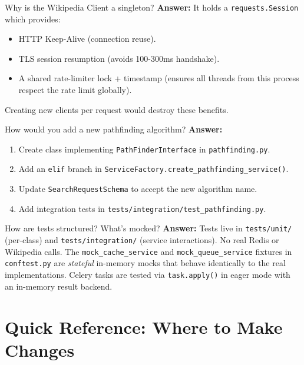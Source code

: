 \documentclass[11pt,a4paper]{article}
\begin{document}
\begin{qabox}{Why is the Wikipedia Client a singleton?}
\textbf{Answer:} It holds a \texttt{requests.Session} which provides:
\begin{itemize}[leftmargin=*, nosep]
    \item HTTP Keep-Alive (connection reuse).
    \item TLS session resumption (avoids 100-300ms handshake).
    \item A shared rate-limiter lock + timestamp (ensures all threads from this process respect the rate limit globally).
\end{itemize}
Creating new clients per request would destroy these benefits.
\end{qabox}

\begin{qabox}{How would you add a new pathfinding algorithm?}
\textbf{Answer:}
\begin{enumerate}[leftmargin=*, nosep]
    \item Create class implementing \texttt{PathFinderInterface} in \texttt{pathfinding.py}.
    \item Add an \texttt{elif} branch in \texttt{ServiceFactory.create\_pathfinding\_service()}.
    \item Update \texttt{SearchRequestSchema} to accept the new algorithm name.
    \item Add integration tests in \texttt{tests/integration/test\_pathfinding.py}.
\end{enumerate}
\end{qabox}

\begin{qabox}{How are tests structured? What's mocked?}
\textbf{Answer:} Tests live in \texttt{tests/unit/} (per-class) and \texttt{tests/integration/} (service interactions). No real Redis or Wikipedia calls. The \texttt{mock\_cache\_service} and \texttt{mock\_queue\_service} fixtures in \texttt{conftest.py} are \emph{stateful} in-memory mocks that behave identically to the real implementations. Celery tasks are tested via \texttt{task.apply()} in eager mode with an in-memory result backend.
\end{qabox}

\section{Quick Reference: Where to Make Changes}
\end{document}
